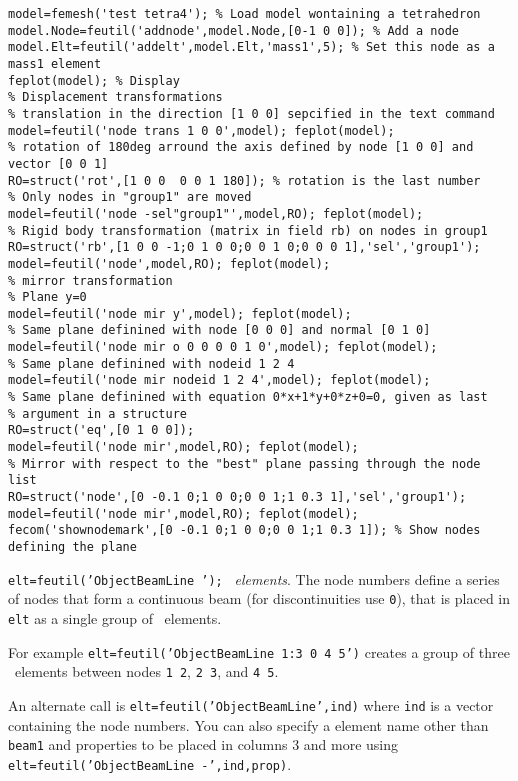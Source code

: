 \begin{verbatim}
model=femesh('test tetra4'); % Load model wontaining a tetrahedron
model.Node=feutil('addnode',model.Node,[0-1 0 0]); % Add a node
model.Elt=feutil('addelt',model.Elt,'mass1',5); % Set this node as a mass1 element
feplot(model); % Display
% Displacement transformations
% translation in the direction [1 0 0] sepcified in the text command
model=feutil('node trans 1 0 0',model); feplot(model); 
% rotation of 180deg arround the axis defined by node [1 0 0] and vector [0 0 1]
RO=struct('rot',[1 0 0  0 0 1 180]); % rotation is the last number
% Only nodes in "group1" are moved
model=feutil('node -sel"group1"',model,RO); feplot(model); 
% Rigid body transformation (matrix in field rb) on nodes in group1
RO=struct('rb',[1 0 0 -1;0 1 0 0;0 0 1 0;0 0 0 1],'sel','group1');
model=feutil('node',model,RO); feplot(model); 
% mirror transformation
% Plane y=0
model=feutil('node mir y',model); feplot(model); 
% Same plane definined with node [0 0 0] and normal [0 1 0]
model=feutil('node mir o 0 0 0 0 1 0',model); feplot(model); 
% Same plane definined with nodeid 1 2 4
model=feutil('node mir nodeid 1 2 4',model); feplot(model);
% Same plane definined with equation 0*x+1*y+0*z+0=0, given as last
% argument in a structure
RO=struct('eq',[0 1 0 0]);
model=feutil('node mir',model,RO); feplot(model);
% Mirror with respect to the "best" plane passing through the node list 
RO=struct('node',[0 -0.1 0;1 0 0;0 0 1;1 0.3 1],'sel','group1');
model=feutil('node mir',model,RO); feplot(model); 
fecom('shownodemark',[0 -0.1 0;1 0 0;0 0 1;1 0.3 1]); % Show nodes defining the plane
\end{verbatim}


{\tt elt=feutil('ObjectBeamLine ');}
\beam\ {\sl elements}.  The node numbers  define a series of nodes that form a continuous beam (for discontinuities use {\tt 0}), that is placed in {\tt elt} as a single group of \beam\ elements.

For example {\tt elt=feutil('ObjectBeamLine 1:3 0 4 5')} creates a group of three \beam\ elements between nodes {\tt 1 2}, {\tt 2 3}, and {\tt 4 5}.

An alternate call is {\tt elt=feutil('ObjectBeamLine',ind)} where {\tt ind} is a vector containing the node numbers. You can also specify a element name other than {\tt beam1} and properties to be placed in columns 3 and more using {\tt elt=feutil('ObjectBeamLine -',ind,prop)}.

